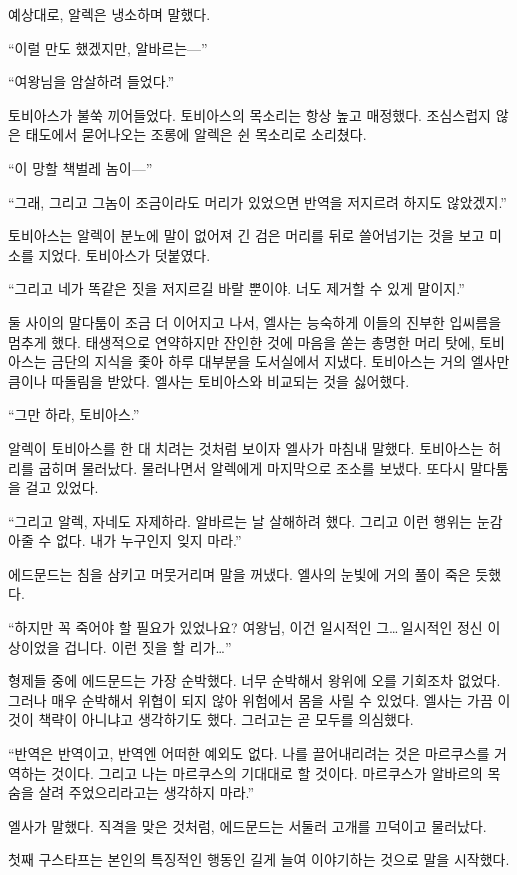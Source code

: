 예상대로, 알렉은 냉소하며 말했다.

``이럴 만도 했겠지만, 알바르는—''

``여왕님을 암살하려 들었다.''

토비아스가 불쑥 끼어들었다. 토비아스의 목소리는 항상 높고 매정했다. 조심스럽지 않은 태도에서 묻어나오는 조롱에 알렉은 쉰 목소리로 소리쳤다.

``이 망할 책벌레 놈이—''

``그래, 그리고 그놈이 조금이라도 머리가 있었으면 반역을 저지르려 하지도 않았겠지.''

토비아스는 알렉이 분노에 말이 없어져 긴 검은 머리를 뒤로 쓸어넘기는 것을 보고 미소를 지었다. 토비아스가 덧붙였다.

``그리고 네가 똑같은 짓을 저지르길 바랄 뿐이야. 너도 제거할 수 있게 말이지.''

둘 사이의 말다툼이 조금 더 이어지고 나서, 엘사는 능숙하게 이들의 진부한 입씨름을 멈추게 했다. 태생적으로 연약하지만 잔인한 것에 마음을 쏟는 총명한 머리 탓에, 토비아스는 금단의 지식을 좇아 하루 대부분을 도서실에서 지냈다. 토비아스는 거의 엘사만큼이나 따돌림을 받았다. 엘사는 토비아스와 비교되는 것을 싫어했다.

``그만 하라, 토비아스.''

알렉이 토비아스를 한 대 치려는 것처럼 보이자 엘사가 마침내 말했다. 토비아스는 허리를 굽히며 물러났다. 물러나면서 알렉에게 마지막으로 조소를 보냈다. 또다시 말다툼을 걸고 있었다.

``그리고 알렉, 자네도 자제하라. 알바르는 날 살해하려 했다. 그리고 이런 행위는 눈감아줄 수 없다. 내가 누구인지 잊지 마라.''

에드문드는 침을 삼키고 머뭇거리며 말을 꺼냈다. 엘사의 눈빛에 거의 풀이 죽은 듯했다.

``하지만 꼭 죽어야 할 필요가 있었나요? 여왕님, 이건 일시적인 그\ldots\,일시적인 정신 이상이었을 겁니다. 이런 짓을 할 리가\ldots''

형제들 중에 에드문드는 가장 순박했다. 너무 순박해서 왕위에 오를 기회조차 없었다. 그러나 매우 순박해서 위협이 되지 않아 위험에서 몸을 사릴 수 있었다. 엘사는 가끔 이것이 책략이 아니냐고 생각하기도 했다. 그러고는 곧 모두를 의심했다.

``반역은 반역이고, 반역엔 어떠한 예외도 없다. 나를 끌어내리려는 것은 마르쿠스를 거역하는 것이다. 그리고 나는 마르쿠스의 기대대로 할 것이다. 마르쿠스가 알바르의 목숨을 살려 주었으리라고는 생각하지 마라.''

엘사가 말했다. 직격을 맞은 것처럼, 에드문드는 서둘러 고개를 끄덕이고 물러났다.

첫째 구스타프는 본인의 특징적인 행동인 길게 늘여 이야기하는 것으로 말을 시작했다.


